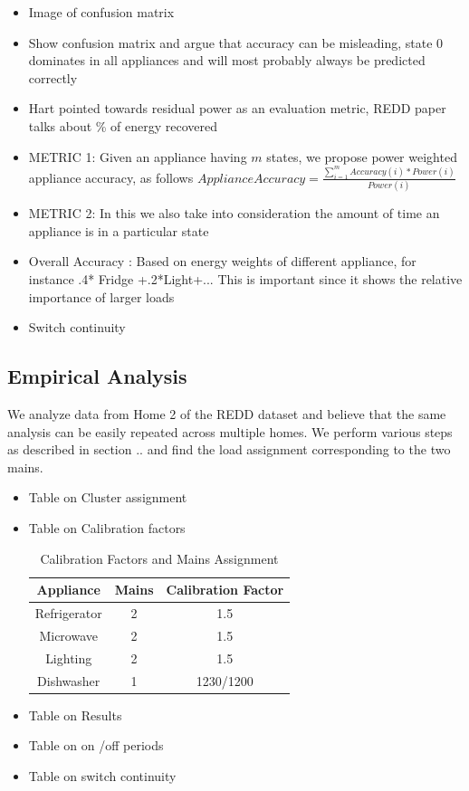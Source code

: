 \documentclass[conference]{IEEEtran}
\begin{document}
    \begin{itemize}
\item Image of confusion matrix
\item Show confusion matrix and argue that accuracy can be misleading, state 0 dominates in all appliances and will most probably always be predicted correctly
\item Hart pointed towards residual power as an evaluation metric, REDD paper talks about \% of energy recovered
\item METRIC 1: Given an appliance having $m$ states, we propose power weighted appliance accuracy, as follows
$Appliance Accuracy = \frac{\sum\limits_{i=1}^{m} Accuracy(i)*Power(i)}{Power(i)} $
\item METRIC 2: In this we also take into consideration the amount of time an appliance is in a particular state
\item Overall Accuracy : Based on energy weights of different appliance, for instance .4* Fridge +.2*Light+...
This is important since it shows the relative importance of larger loads 
\item Switch continuity
\end{itemize}

\subsection{Empirical Analysis}
We analyze data from Home 2 of the REDD dataset and believe that the same analysis can be easily repeated across multiple homes. We perform various steps as described in section .. and find the load assignment corresponding to the two mains. 

\begin{itemize}
\item Table on Cluster assignment
\item Table on Calibration factors
\begin{table}
\caption{Calibration Factors and Mains Assignment}
\label{calibration_factors}
\centering
\begin{tabular}{|c|c|c|}
\hline
Appliance & Mains & Calibration Factor\\
\hline
Refrigerator & 2&1.5\\
Microwave & 2&1.5\\
Lighting & 2&1.5\\
Dishwasher & 1&1230/1200\\
\hline

\end{tabular}
\end{table}
\item Table on Results
\item Table on on /off periods
\item Table on switch continuity
\end{itemize}
\end{document}
